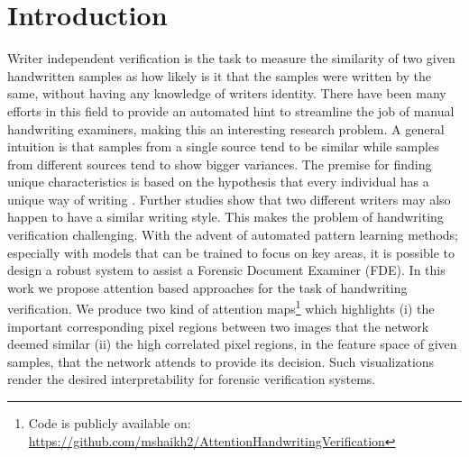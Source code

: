 \documentclass[a4paper,conference]{IEEEtran}
\begin{document}
\section{Introduction}
Writer independent verification is the task to measure the similarity of two given handwritten samples as how likely is it that the samples were written by the same, without having any knowledge of writers identity. There have been many efforts in this field to provide an automated hint to streamline the job of manual handwriting examiners, making this an interesting research problem. 
\newline \indent A general intuition is that samples from a single source tend to be similar while samples from different sources tend to show bigger variances. The premise for finding unique characteristics is based on the hypothesis that every individual has a unique way of writing \cite{srihari_individuality_2001}. Further studies show that two different writers may also happen to have a similar writing style. This makes the problem of handwriting verification challenging.
\newline \indent With the advent of automated pattern learning methods; especially with models that can be trained to focus on key areas, it is possible to design a robust system to assist a Forensic Document Examiner (FDE). In this work we propose attention based approaches for the task of handwriting verification. We produce two kind of attention maps\footnote{Code is publicly available on: \\ \href{https://github.com/mshaikh2/AttentionHandwritingVerification}{https://github.com/mshaikh2/AttentionHandwritingVerification}} which highlights (i)  the important corresponding pixel regions between two images that the network deemed similar (ii) the high correlated pixel regions, in the feature space of given samples, that the network attends to provide its decision. Such visualizations render the desired interpretability for forensic verification systems.
\end{document}
